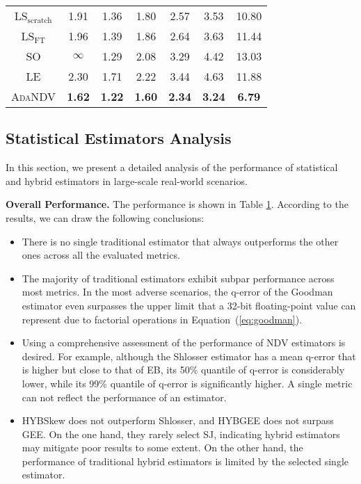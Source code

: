 \begin{table}[]
\begin{tabular}{ccccccc}
    LS$_{\mathrm{scratch}}$ & 1.91 & 1.36 & 1.80 & 2.57 & 3.53 & 10.80\\
    
    LS$_{\mathrm{FT}}$ & 1.96 & 1.39 & 1.86 & 2.64 & 3.63 & 11.44 \\

    {SO}  & $\infty$ & 1.29 & 2.08 & 3.29& 4.42 & 13.03 \\
    
    {LE} & 2.30 & 1.71 & 2.22 & 3.44 & 4.63 & 11.88\\

\midrule
    \textsc{AdaNDV} & \textbf{1.62} & \textbf{1.22}& \textbf{1.60} & \textbf{2.34} & \textbf{3.24} & \textbf{6.79} \\
    
\bottomrule
    \end{tabular}
    \label{tab:overall}
\end{table}





\subsection{Statistical Estimators Analysis}
\label{sec:perf-traditional}
In this section, we present a detailed analysis of the performance of statistical and hybrid estimators in large-scale real-world scenarios.




\noindent\textbf{Overall Performance.} The performance is shown in Table \ref{tab:overall}. According to the results, we can draw the following conclusions:

\begin{itemize}[leftmargin=10pt]
\item There is no single traditional estimator that always outperforms the other ones across all the evaluated metrics. 
\item The majority of traditional estimators exhibit subpar performance across most metrics. In the most adverse scenarios, the q-error of the Goodman estimator even surpasses the upper limit that a 32-bit floating-point value can represent due to factorial operations in Equation~(\ref{eq:goodman}).
\item Using a comprehensive assessment of the performance of NDV estimators is desired. 
For example, although the Shlosser estimator has a mean q-error that is higher but close to that of EB, its 50\% quantile of q-error is considerably lower, while its 99\% quantile of q-error is significantly higher. A single metric can not reflect the performance of an estimator.
\item HYBSkew does not outperform Shlosser, and HYBGEE does not surpass GEE. On the one hand, they rarely select SJ, indicating hybrid estimators may mitigate poor results to some extent. On the other hand, the performance of traditional hybrid estimators is limited by the selected single estimator.
\end{itemize}


